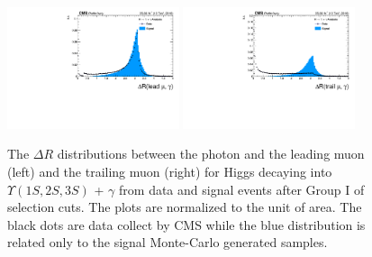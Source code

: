 \begin{figure}[!htbp]
\begin{center}
\includegraphics[width=0.45\textwidth]{figures_and_tables/outputPlots/HtoUpsilon_Cat0_ZZZZZ/au/data_x_mc/noKinCuts/h_noKin_deltaR_Leading_Photon}\hspace*{1.cm}
\includegraphics[width=0.45\textwidth]{figures_and_tables/outputPlots/HtoUpsilon_Cat0_ZZZZZ/au/data_x_mc/noKinCuts/h_noKin_deltaR_Trailing_Photon}\end{center}\vspace*{-.5cm}
\caption{The $\Delta R$ distributions between the photon and the leading muon (left) and the trailing muon (right) for Higgs decaying into $\Upsilon(1S,2S,3S)$ + $\gamma$ from data and signal events after Group I of selection cuts. The plots are normalized to the unit of area. The black dots are data collect by CMS while the blue distribution is related only to the signal Monte-Carlo generated samples.}
\label{fig:deltaR_HtoUpsilon_Cat0}
\end{figure}

